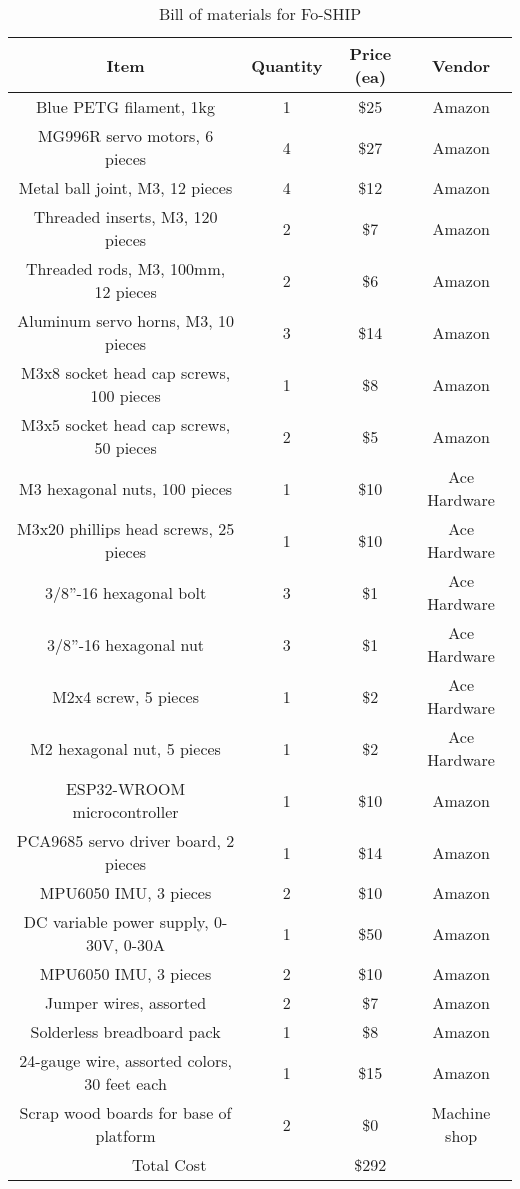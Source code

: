 \documentclass[11pt]{ucthesisCP}
\begin{document}
\begin{table}[htbp]
	\centering
	\caption{Bill of materials for Fo-SHIP}
	\label{tab:bomfoship}
	\begin{tabular}{|c|c|c|c|}
		\hline
		Item & Quantity & Price (ea) & Vendor \\
		\hline
		Blue PETG filament, 1kg & 1 & \$25 & Amazon \\
		\hline
		MG996R servo motors, 6 pieces & 4 & \$27 & Amazon \\
		\hline
		Metal ball joint, M3, 12 pieces & 4 & \$12 & Amazon \\
		\hline
		Threaded inserts, M3, 120 pieces & 2 & \$7 & Amazon \\
		\hline
		Threaded rods, M3, 100mm, 12 pieces & 2 & \$6 & Amazon \\
		\hline
		Aluminum servo horns, M3, 10 pieces & 3 & \$14 & Amazon \\
		\hline
		M3x8 socket head cap screws, 100 pieces & 1 & \$8 & Amazon \\
		\hline
		M3x5 socket head cap screws, 50 pieces & 2 & \$5 & Amazon \\
		\hline
		M3 hexagonal nuts, 100 pieces & 1 & \$10 & Ace Hardware \\
		\hline
		M3x20 phillips head screws, 25 pieces & 1 & \$10 & Ace Hardware \\
		\hline
		3/8”-16 hexagonal bolt & 3 & \$1 & Ace Hardware \\
		\hline
		3/8”-16 hexagonal nut & 3 & \$1 & Ace Hardware \\
		\hline
		M2x4 screw, 5 pieces & 1 & \$2 & Ace Hardware \\
		\hline
		M2 hexagonal nut, 5 pieces & 1 & \$2 & Ace Hardware \\
		\hline
		ESP32-WROOM microcontroller & 1 & \$10 & Amazon \\
		\hline
		PCA9685 servo driver board, 2 pieces & 1 & \$14 & Amazon \\
		\hline
		MPU6050 IMU, 3 pieces & 2 & \$10 & Amazon \\
		\hline
		DC variable power supply, 0-30V, 0-30A & 1 & \$50 & Amazon \\
		\hline
		MPU6050 IMU, 3 pieces & 2 & \$10 & Amazon \\
		\hline
		Jumper wires, assorted & 2 & \$7 & Amazon \\
		\hline
		Solderless breadboard pack & 1 & \$8 & Amazon \\
		\hline
		24-gauge wire, assorted colors, 30 feet each & 1 & \$15 & Amazon \\
		\hline
		Scrap wood boards for base of platform & 2 & \$0 & Machine shop \\
		\hline
		\multicolumn{2}{|c|}{Total Cost} & \$292 &  \\
		\hline
	\end{tabular}
\end{table}
\end{document}
